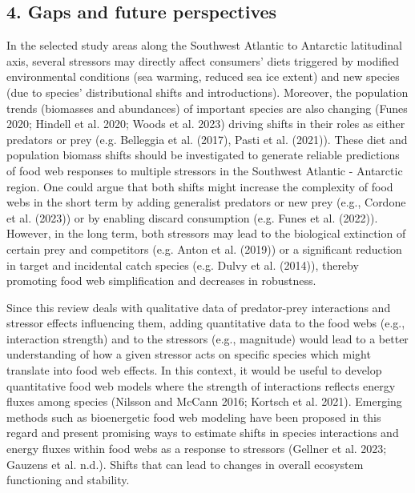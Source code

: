 \documentclass[
]{article}
\begin{document}
\normalsize

\subsection{4. Gaps and future
perspectives}\label{gaps-and-future-perspectives}

In the selected study areas along the Southwest Atlantic to Antarctic
latitudinal axis, several stressors may directly affect consumers' diets
triggered by modified environmental conditions (sea warming, reduced sea
ice extent) and new species (due to species' distributional shifts and
introductions). Moreover, the population trends (biomasses and
abundances) of important species are also changing (Funes 2020; Hindell
et al. 2020; Woods et al. 2023) driving shifts in their roles as either
predators or prey (e.g. Belleggia et al. (2017), Pasti et al. (2021)).
These diet and population biomass shifts should be investigated to
generate reliable predictions of food web responses to multiple
stressors in the Southwest Atlantic - Antarctic region. One could argue
that both shifts might increase the complexity of food webs in the short
term by adding generalist predators or new prey (e.g., Cordone et al.
(2023)) or by enabling discard consumption (e.g. Funes et al. (2022)).
However, in the long term, both stressors may lead to the biological
extinction of certain prey and competitors (e.g. Anton et al. (2019)) or
a significant reduction in target and incidental catch species (e.g.
Dulvy et al. (2014)), thereby promoting food web simplification and
decreases in robustness.

Since this review deals with qualitative data of predator-prey
interactions and stressor effects influencing them, adding quantitative
data to the food webs (e.g., interaction strength) and to the stressors
(e.g., magnitude) would lead to a better understanding of how a given
stressor acts on specific species which might translate into food web
effects. In this context, it would be useful to develop quantitative
food web models where the strength of interactions reflects energy
fluxes among species (Nilsson and McCann 2016; Kortsch et al. 2021).
Emerging methods such as bioenergetic food web modeling have been
proposed in this regard and present promising ways to estimate shifts in
species interactions and energy fluxes within food webs as a response to
stressors (Gellner et al. 2023; Gauzens et al. n.d.). Shifts that can
lead to changes in overall ecosystem functioning and stability.
\end{document}
